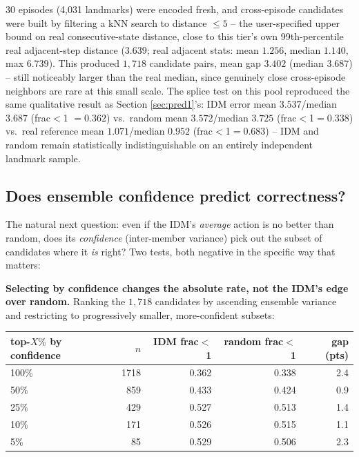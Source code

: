 \documentclass[11pt]{article}
\begin{document}
30 episodes (4{,}031 landmarks) were encoded fresh, and cross-episode candidates were built
by filtering a kNN search to distance $\le 5$ -- the user-specified upper bound on real
consecutive-state distance, close to this tier's own 99th-percentile real adjacent-step
distance ($3.639$; real adjacent stats: mean $1.256$, median $1.140$, max $6.739$). This
produced $1{,}718$ candidate pairs, mean gap $3.402$ (median $3.687$) -- still noticeably
larger than the real median, since genuinely close cross-episode neighbors are rare at this
small scale. The splice test on this pool reproduced the same qualitative result as
Section \ref{sec:pred1}'s: IDM error mean $3.537$/median $3.687$ (frac$<$1 $=0.362$) vs.\
random mean $3.572$/median $3.725$ (frac$<$1$=0.338$) vs.\ real reference mean $1.071$/median
$0.952$ (frac$<$1$=0.683$) -- IDM and random remain statistically indistinguishable on an
entirely independent landmark sample.

\subsection{Does ensemble confidence predict correctness?}
\label{sec:confidence}

The natural next question: even if the IDM's \emph{average} action is no better than random,
does its \emph{confidence} (inter-member variance) pick out the subset of candidates where it
\emph{is} right? Two tests, both negative in the specific way that matters:

\textbf{Selecting by confidence changes the absolute rate, not the IDM's edge over random.}
Ranking the $1{,}718$ candidates by ascending ensemble variance and restricting to
progressively smaller, more-confident subsets:

\begin{center}
\begin{tabular}{@{}lrrrr@{}}
\toprule
top-$X\%$ by confidence & $n$ & IDM frac$<$1 & random frac$<$1 & gap (pts) \\
\midrule
100\% & 1718 & 0.362 & 0.338 & 2.4 \\
50\%  & 859  & 0.433 & 0.424 & 0.9 \\
25\%  & 429  & 0.527 & 0.513 & 1.4 \\
10\%  & 171  & 0.526 & 0.515 & 1.1 \\
5\%   & 85   & 0.529 & 0.506 & 2.3 \\
\bottomrule
\end{tabular}
\end{center}
\end{document}
